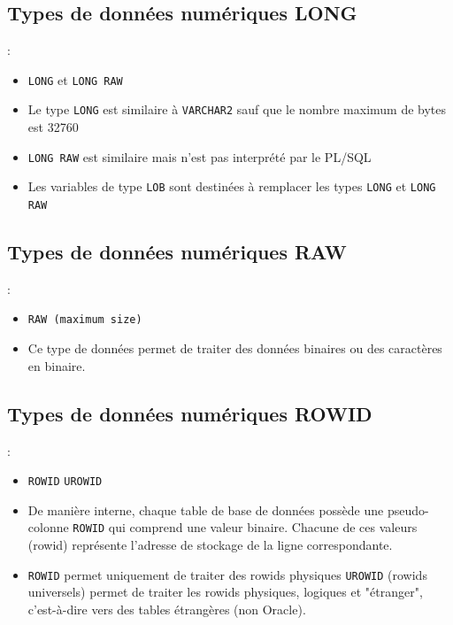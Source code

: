 \documentclass[10pt]{beamer}
\begin{document}
\subsection{Types de données numériques LONG}
\begin{frame}{\secname : \subsecname}
    \begin{itemize}
        \item \lstinline[language=plsql]!LONG! et \lstinline[language=plsql]!LONG RAW!
        \item Le type \lstinline[language=plsql]!LONG! est similaire à \lstinline[language=plsql]!VARCHAR2! sauf que le nombre maximum de bytes est 32760
        \item \lstinline[language=plsql]!LONG RAW! est similaire mais n'est pas interprété par le PL/SQL
        \item Les variables de type \lstinline[language=plsql]!LOB! sont destinées à remplacer les types \lstinline[language=plsql]!LONG! et \lstinline[language=plsql]!LONG RAW!
    \end{itemize}
\end{frame}

\subsection{Types de données numériques RAW}
\begin{frame}{\secname : \subsecname}
    \begin{itemize}
        \item \lstinline[language=plsql]!RAW (maximum size)!
        \item Ce type de données permet de traiter des données binaires ou des caractères en binaire.
    \end{itemize}
\end{frame}

\subsection{Types de données numériques ROWID}
\begin{frame}{\secname : \subsecname}
    \begin{itemize}
        \item \lstinline[language=plsql]!ROWID! \lstinline[language=plsql]!UROWID!
        \item De manière interne, chaque table de base de données possède une pseudo-colonne \lstinline[language=plsql]!ROWID! qui comprend une valeur binaire.  Chacune de ces valeurs (rowid) représente l'adresse de stockage de la ligne correspondante.
        \item \lstinline[language=plsql]!ROWID! permet uniquement de traiter des rowids physiques \lstinline[language=plsql]!UROWID! (rowids universels) permet de traiter les rowids physiques, logiques et "étranger", c'est-à-dire vers des tables étrangères (non Oracle).
    \end{itemize}
    
\end{frame}
\end{document}
